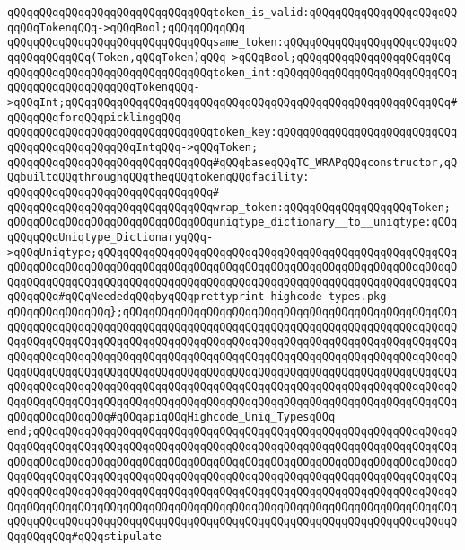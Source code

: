 \verb|qQQqqQQqqQQqqQQqqQQqqQQqqQQqqQQqtoken_is_valid:qQQqqQQqqQQqqQQqqQQqqQQqqQQqTokenqQQq->qQQqBool;qQQqqQQqqQQq|\newline
\verb|qQQqqQQqqQQqqQQqqQQqqQQqqQQqqQQqsame_token:qQQqqQQqqQQqqQQqqQQqqQQqqQQqqQQqqQQqqQQq(Token,qQQqToken)qQQq->qQQqBool;qQQqqQQqqQQqqQQqqQQqqQQq|\newline
\verb|qQQqqQQqqQQqqQQqqQQqqQQqqQQqqQQqtoken_int:qQQqqQQqqQQqqQQqqQQqqQQqqQQqqQQqqQQqqQQqqQQqqQQqTokenqQQq->qQQqInt;qQQqqQQqqQQqqQQqqQQqqQQqqQQqqQQqqQQqqQQqqQQqqQQqqQQqqQQqqQQq#qQQqqQQqforqQQqpicklingqQQq|\newline
\verb|qQQqqQQqqQQqqQQqqQQqqQQqqQQqqQQqtoken_key:qQQqqQQqqQQqqQQqqQQqqQQqqQQqqQQqqQQqqQQqqQQqqQQqIntqQQq->qQQqToken;|\newline
\newline
\verb|qQQqqQQqqQQqqQQqqQQqqQQqqQQqqQQq#qQQqbaseqQQqTC_WRAPqQQqconstructor,qQQqbuiltqQQqthroughqQQqtheqQQqtokenqQQqfacility:|\newline
\verb|qQQqqQQqqQQqqQQqqQQqqQQqqQQqqQQq#|\newline
\verb|qQQqqQQqqQQqqQQqqQQqqQQqqQQqqQQqwrap_token:qQQqqQQqqQQqqQQqqQQqToken;|\newline
\newline
\newline
\verb|qQQqqQQqqQQqqQQqqQQqqQQqqQQqqQQquniqtype_dictionary__to__uniqtype:qQQqqQQqqQQqUniqtype_DictionaryqQQq->qQQqUniqtype;qQQqqQQqqQQqqQQqqQQqqQQqqQQqqQQqqQQqqQQqqQQqqQQqqQQqqQQqqQQqqQQqqQQqqQQqqQQqqQQqqQQqqQQqqQQqqQQqqQQqqQQqqQQqqQQqqQQqqQQqqQQqqQQqqQQqqQQqqQQqqQQqqQQqqQQqqQQqqQQqqQQqqQQqqQQqqQQqqQQqqQQqqQQqqQQqqQQqqQQqqQQq#qQQqNeededqQQqbyqQQqprettyprint-highcode-types.pkg|\newline
\newline
\verb|qQQqqQQqqQQqqQQq};qQQqqQQqqQQqqQQqqQQqqQQqqQQqqQQqqQQqqQQqqQQqqQQqqQQqqQQqqQQqqQQqqQQqqQQqqQQqqQQqqQQqqQQqqQQqqQQqqQQqqQQqqQQqqQQqqQQqqQQqqQQqqQQqqQQqqQQqqQQqqQQqqQQqqQQqqQQqqQQqqQQqqQQqqQQqqQQqqQQqqQQqqQQqqQQqqQQqqQQqqQQqqQQqqQQqqQQqqQQqqQQqqQQqqQQqqQQqqQQqqQQqqQQqqQQqqQQqqQQqqQQqqQQqqQQqqQQqqQQqqQQqqQQqqQQqqQQqqQQqqQQqqQQqqQQqqQQqqQQqqQQqqQQqqQQqqQQqqQQqqQQqqQQqqQQqqQQqqQQqqQQqqQQqqQQqqQQqqQQqqQQqqQQqqQQqqQQqqQQqqQQqqQQqqQQqqQQqqQQqqQQqqQQqqQQqqQQqqQQqqQQqqQQqqQQqqQQqqQQqqQQqqQQqqQQqqQQqqQQqqQQqqQQq#qQQqapiqQQqHighcode_Uniq_TypesqQQq|\newline
\verb|end;qQQqqQQqqQQqqQQqqQQqqQQqqQQqqQQqqQQqqQQqqQQqqQQqqQQqqQQqqQQqqQQqqQQqqQQqqQQqqQQqqQQqqQQqqQQqqQQqqQQqqQQqqQQqqQQqqQQqqQQqqQQqqQQqqQQqqQQqqQQqqQQqqQQqqQQqqQQqqQQqqQQqqQQqqQQqqQQqqQQqqQQqqQQqqQQqqQQqqQQqqQQqqQQqqQQqqQQqqQQqqQQqqQQqqQQqqQQqqQQqqQQqqQQqqQQqqQQqqQQqqQQqqQQqqQQqqQQqqQQqqQQqqQQqqQQqqQQqqQQqqQQqqQQqqQQqqQQqqQQqqQQqqQQqqQQqqQQqqQQqqQQqqQQqqQQqqQQqqQQqqQQqqQQqqQQqqQQqqQQqqQQqqQQqqQQqqQQqqQQqqQQqqQQqqQQqqQQqqQQqqQQqqQQqqQQqqQQqqQQqqQQqqQQqqQQqqQQqqQQqqQQqqQQqqQQqqQQqqQQqqQQqqQQqqQQqqQQq#qQQqstipulate|\newline
